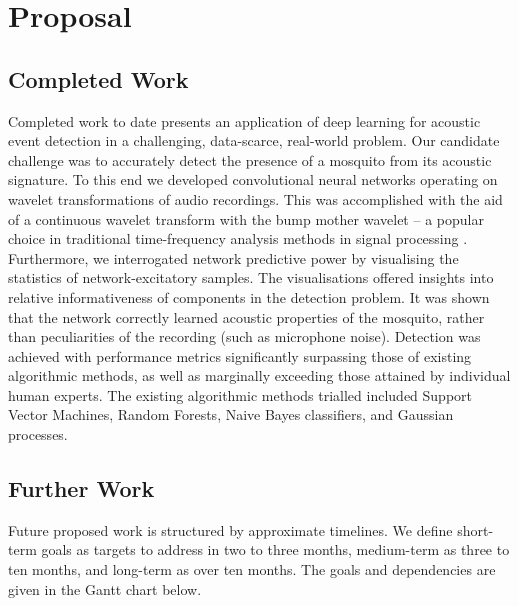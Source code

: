 \documentclass[12pt]{llncs}
\begin{document}







\section{Proposal}
\label{sec:proposal}
\subsection{Completed Work}
Completed work to date presents an application of deep learning for acoustic event detection in a challenging, data-scarce, real-world problem. Our candidate challenge was to accurately detect the presence of a mosquito from its acoustic signature. To this end we developed convolutional neural networks operating on wavelet transformations of audio recordings. This was accomplished with the aid of a continuous wavelet transform with the bump mother wavelet -- a popular choice in traditional time-frequency analysis methods in signal processing \cite{daubechies2011synchrosqueezed}. Furthermore, we interrogated network predictive power by visualising the statistics of network-excitatory samples. The visualisations offered insights into relative informativeness of components in the detection problem. It was shown that the network correctly learned acoustic properties of the mosquito, rather than peculiarities of the recording (such as microphone noise). Detection was achieved with performance metrics significantly surpassing those of existing algorithmic methods, as well as marginally exceeding those attained by individual human experts. The existing algorithmic methods trialled included Support Vector Machines, Random Forests, Naive Bayes classifiers, and Gaussian processes.


\subsection{Further Work}
Future proposed work is structured by approximate timelines. We define short-term goals as targets to address in two to three months, medium-term as three to ten months, and long-term as over ten months. The goals and dependencies are given in the Gantt chart below. 
\end{document}
